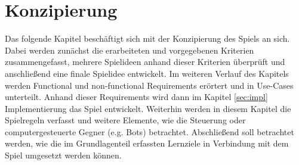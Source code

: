 \section{Konzipierung}
Das folgende Kapitel beschäftigt sich mit der Konzipierung des Spiels an sich. Dabei werden zunächst die erarbeiteten und vorgegebenen Kriterien zusammengefasst, mehrere Spielideen anhand dieser Kriterien überprüft und anschließend eine finale Spielidee entwickelt. Im weiteren Verlauf des Kapitels werden Functional und non-functional Requirements erörtert und in Use-Cases unterteilt. Anhand dieser Requirements wird dann im Kapitel \ref{sec:impl} Implementierung das Spiel entwickelt. Weiterhin werden in diesem Kapitel die Spielregeln verfasst und weitere Elemente, wie die Steuerung oder computergesteuerte Gegner (e.g. Bots) betrachtet. Abschließend soll betrachtet werden, wie die im Grundlagenteil erfassten Lernziele in Verbindung mit dem Spiel umgesetzt werden können.
